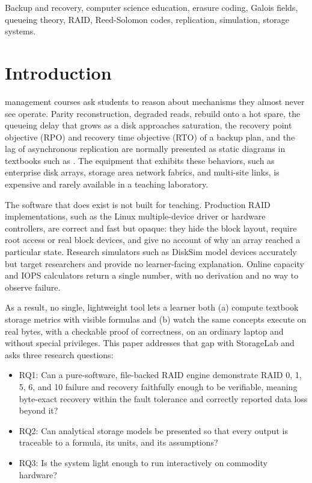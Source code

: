 \documentclass{ieeeaccess}
\begin{document}
\begin{keywords}
Backup and recovery, computer science education, erasure coding, Galois fields, queueing theory, RAID, Reed-Solomon codes, replication, simulation, storage systems.
\end{keywords}

\titlepgskip=-15pt

\maketitle

\section{Introduction}
\label{sec:intro}
 management courses ask students to reason about mechanisms they almost never see operate. Parity reconstruction, degraded reads, rebuild onto a hot spare, the queueing delay that grows as a disk approaches saturation, the recovery point objective (RPO) and recovery time objective (RTO) of a backup plan, and the lag of asynchronous replication are normally presented as static diagrams in textbooks such as \cite{emc2012ism}. The equipment that exhibits these behaviors, such as enterprise disk arrays, storage area network fabrics, and multi-site links, is expensive and rarely available in a teaching laboratory.

The software that does exist is not built for teaching. Production RAID implementations, such as the Linux multiple-device driver or hardware controllers, are correct and fast but opaque: they hide the block layout, require root access or real block devices, and give no account of why an array reached a particular state. Research simulators such as DiskSim \cite{bucy2008disksim} model devices accurately but target researchers and provide no learner-facing explanation. Online capacity and IOPS calculators return a single number, with no derivation and no way to observe failure.

As a result, no single, lightweight tool lets a learner both (a) compute textbook storage metrics with visible formulas and (b) watch the same concepts execute on real bytes, with a checkable proof of correctness, on an ordinary laptop and without special privileges. This paper addresses that gap with StorageLab and asks three research questions:
\begin{itemize}
\item RQ1: Can a pure-software, file-backed RAID engine demonstrate RAID 0, 1, 5, 6, and 10 failure and recovery faithfully enough to be verifiable, meaning byte-exact recovery within the fault tolerance and correctly reported data loss beyond it?
\item RQ2: Can analytical storage models be presented so that every output is traceable to a formula, its units, and its assumptions?
\item RQ3: Is the system light enough to run interactively on commodity hardware?
\end{itemize}
\end{document}
